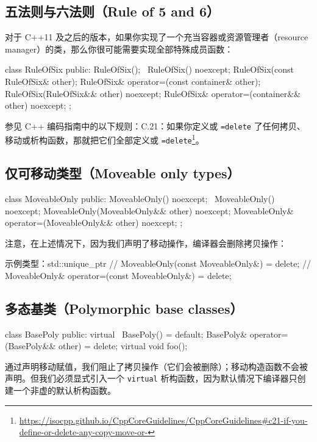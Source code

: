 \subsection{五法则与六法则（Rule of 5 and 6）}

对于 C++11 及之后的版本，如果你实现了一个充当容器或资源管理者（resource manager）的类，那么你很可能需要实现全部特殊成员函数：

\begin{codebox}[cpp]
class RuleOfSix {
public:
RuleOfSix();
~RuleOfSix() noexcept;
RuleOfSix(const RuleOfSix& other);
RuleOfSix& operator=(const container& other);
RuleOfSix(RuleOfSix&& other) noexcept;
RuleOfSix& operator=(container&& other) noexcept;
};
\end{codebox}

参见 C++ 编码指南中的以下规则：C.21：如果你定义或 \texttt{=delete} 了任何拷贝、移动或析构函数，那就把它们全部定义或 \texttt{=delete}\footnote{\url{https://isocpp.github.io/CppCoreGuidelines/CppCoreGuidelines\#c21-if-you-define-or-delete-any-copy-move-or-}}。

\subsection{仅可移动类型（Moveable only types）}

\begin{codebox}[cpp]
class MoveableOnly {
public:
MoveableOnly() noexcept;
~MoveableOnly() noexcept;
MoveableOnly(MoveableOnly&& other) noexcept;
MoveableOnly& operator=(MoveableOnly&& other) noexcept;
};
\end{codebox}

注意，在上述情况下，因为我们声明了移动操作，编译器会删除拷贝操作：

\begin{codeboxt}[cpp]{示例类型：std::unique\_ptr}
// MoveableOnly(const MoveableOnly&) = delete;
// MoveableOnly& operator=(const MoveableOnly&) = delete;
\end{codeboxt}

\subsection{多态基类（Polymorphic base classes）}

\begin{codebox}[cpp]
class BasePoly {
public:
virtual ~BasePoly() = default;
BasePoly& operator=(BasePoly&& other) = delete;
virtual void foo();
}
\end{codebox}

通过声明移动赋值，我们阻止了拷贝操作（它们会被删除）；移动构造函数不会被声明。但我们必须显式引入一个 \texttt{virtual} 析构函数，因为默认情况下编译器只创建一个非虚的默认析构函数。
